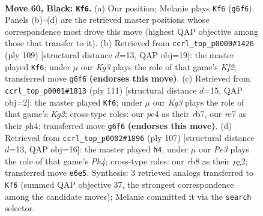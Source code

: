 \documentclass[11pt]{article}
\begin{document}
\clearpage

\begin{figure}[p]\centering
\begin{subfigure}{0.46\textwidth}\centering
\resizebox{\linewidth}{!}{%
\newchessgame
\chessboard[
  setfen={1R6/2R2p2/4p1k1/8/P3PK2/5P2/7r/8 b - - 12 60},
  showmover=false,
  pgfstyle=straightmove, color=movearrow, markmove={g6-f6}
]}
\caption{}
\end{subfigure}\hfill
\begin{subfigure}{0.46\textwidth}\centering
\resizebox{\linewidth}{!}{%
\newchessgame
\chessboard[
  setfen={8/5k2/1R2p3/5p2/8/4P1K1/3r1PP1/8 b - - 27 55},
  showmover=false,
  pgfstyle=straightmove, color=movearrow, markmove={f7-f6}
]}
\caption{}
\end{subfigure}
\\[4pt]
\begin{subfigure}{0.46\textwidth}\centering
\resizebox{\linewidth}{!}{%
\newchessgame
\chessboard[
  setfen={8/1R4k1/6p1/7p/r6P/6K1/5PP1/8 b - - 9 56},
  showmover=false,
  pgfstyle=straightmove, color=movearrow, markmove={g7-f6}
]}
\caption{}
\end{subfigure}\hfill
\begin{subfigure}{0.46\textwidth}\centering
\resizebox{\linewidth}{!}{%
\newchessgame
\chessboard[
  setfen={8/6k1/4R1p1/7p/8/5K1P/r4PP1/8 b - - 3 54},
  showmover=false,
  pgfstyle=straightmove, color=movearrow, markmove={h5-h4}
]}
\caption{}
\end{subfigure}
\caption{\textbf{Move 60, Black: \texttt{Kf6}.} (a) Our position; Melanie plays \texttt{Kf6} (\texttt{g6f6}). Panels (b)--(d) are the retrieved master positions whose correspondence most drove this move (highest QAP objective among those that transfer to it). (b) Retrieved from \texttt{ccrl\_top\_p0000\#1426} (ply 109) [structural distance $d$=13, QAP obj=19]: the master played \texttt{Kf6}; under $\mu$ our \emph{Kg3} plays the role of that game's \emph{Kf2}; transferred move \texttt{g6f6} \textbf{(endorses this move)}. (c) Retrieved from \texttt{ccrl\_top\_p0001\#1813} (ply 111) [structural distance $d$=15, QAP obj=2]: the master played \texttt{Kf6}; under $\mu$ our \emph{Kg3} plays the role of that game's \emph{Kg2}; cross-type roles: our \emph{p}e4 as their \emph{r}b7, our \emph{r}c7 as their \emph{p}h4; transferred move \texttt{g6f6} \textbf{(endorses this move)}. (d) Retrieved from \texttt{ccrl\_top\_p0002\#1896} (ply 107) [structural distance $d$=13, QAP obj=16]: the master played \texttt{h4}; under $\mu$ our \emph{Pe3} plays the role of that game's \emph{Ph4}; cross-type roles: our \emph{r}b8 as their \emph{p}g2; transferred move \texttt{e6e5}. Synthesis: 3 retrieved analogs transferred to \texttt{Kf6} (summed QAP objective 37, the strongest correspondence among the candidate moves); Melanie committed it via the \texttt{search} selector.}
\label{fig:thought-m119}
\end{figure}
\end{document}
